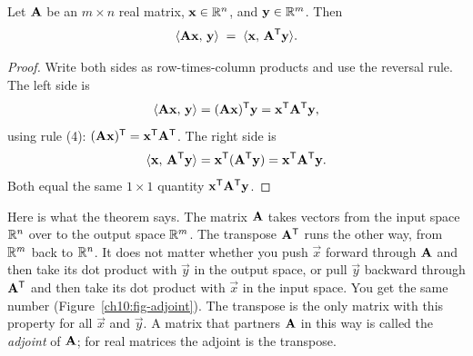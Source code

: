 \begin{theorem}\label{ch10:thm-adjoint}
Let $\mathbf{A}$ be an $m\times n$ real matrix, $\mathbf{x}\in\mathbb{R}^n$, and $\mathbf{y}\in\mathbb{R}^m$. Then
\[
  \langle \mathbf{A}\mathbf{x},\, \mathbf{y} \rangle \;=\; \langle \mathbf{x},\, \mathbf{A}^{\mathsf{T}}\mathbf{y} \rangle.
\]
\end{theorem}

\begin{proof}
Write both sides as row-times-column products and use the reversal rule. The left side is
\[
  \langle \mathbf{A}\mathbf{x},\, \mathbf{y} \rangle
  = (\mathbf{A}\mathbf{x})^{\mathsf{T}}\mathbf{y}
  = \mathbf{x}^{\mathsf{T}}\mathbf{A}^{\mathsf{T}}\mathbf{y},
\]
using rule (4): $(\mathbf{A}\mathbf{x})^{\mathsf{T}} = \mathbf{x}^{\mathsf{T}}\mathbf{A}^{\mathsf{T}}$. The right side is
\[
  \langle \mathbf{x},\, \mathbf{A}^{\mathsf{T}}\mathbf{y} \rangle
  = \mathbf{x}^{\mathsf{T}}(\mathbf{A}^{\mathsf{T}}\mathbf{y})
  = \mathbf{x}^{\mathsf{T}}\mathbf{A}^{\mathsf{T}}\mathbf{y}.
\]
Both equal the same $1\times 1$ quantity $\mathbf{x}^{\mathsf{T}}\mathbf{A}^{\mathsf{T}}\mathbf{y}$.
\end{proof}

Here is what the theorem says. The matrix $\mathbf{A}$ takes vectors from the input
space $\mathbb{R}^n$ over to the output space $\mathbb{R}^m$. The
transpose $\mathbf{A}^{\mathsf{T}}$ runs the other way, from $\mathbb{R}^m$ back to $\mathbb{R}^n$. It does not
matter whether you push $\vec{x}$ forward through $\mathbf{A}$ and then take its dot product with
$\vec{y}$ in the output space, or pull $\vec{y}$ backward through $\mathbf{A}^{\mathsf{T}}$ and then take its
dot product with $\vec{x}$ in the input space. You get the same number
(Figure~\ref{ch10:fig-adjoint}). The transpose is the only matrix with this property for all
$\vec{x}$ and $\vec{y}$. A matrix that partners $\mathbf{A}$ in this way is called the
\emph{adjoint} of $\mathbf{A}$; for real matrices the adjoint is the transpose.

